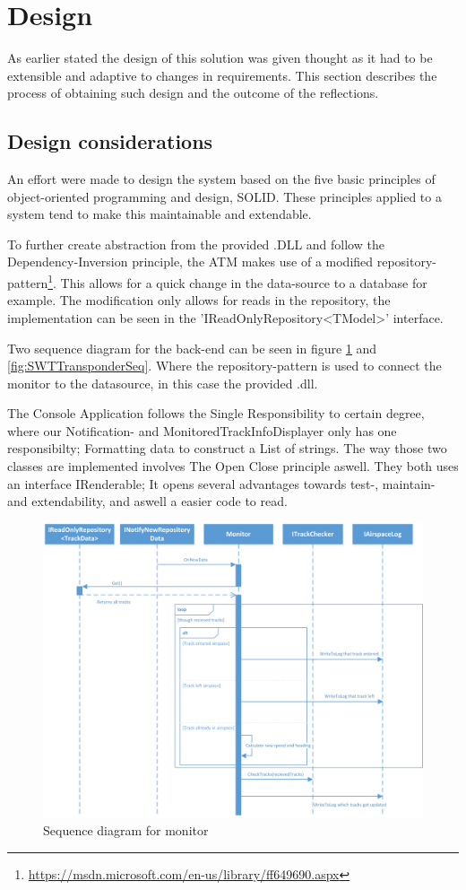 \section{Design}
As earlier stated the design of this solution was given thought as it had to be extensible and adaptive to changes in requirements. This section describes the process of obtaining such design and the outcome of the reflections.

\subsection{Design considerations}
An effort were made to design the system based on the five basic principles of object-oriented programming and design, SOLID. These principles applied to a system tend to make this maintainable and extendable.

To further create abstraction from the provided .DLL and follow the Dependency-Inversion principle, the ATM makes use of a modified repository-pattern\footnote{\url{https://msdn.microsoft.com/en-us/library/ff649690.aspx}}. This allows for a quick change in the data-source to a database for example.
The modification only allows for reads in the repository, the implementation can be seen in the 'IReadOnlyRepository<TModel>' interface.

Two sequence diagram for the back-end can be seen in figure \ref{fig:MonitorSeq} and \ref{fig:SWTTransponderSeq}. Where the repository-pattern is used to connect the monitor to the datasource, in this case the provided .dll.

The Console Application follows the Single Responsibility to certain degree, where our Notification- and MonitoredTrackInfoDisplayer only has one responsibilty; Formatting data to construct a List of strings. The way those two classes are implemented involves The Open Close principle aswell. They both uses an interface IRenderable; It opens several advantages towards test-, maintain- and extendability, and aswell a easier code to read. 
\begin{figure}
	\centering
	\includegraphics[width=1.0\linewidth]{Images/MonitorSeq}
	\caption{Sequence diagram for monitor}
	\label{fig:MonitorSeq}
\end{figure}

